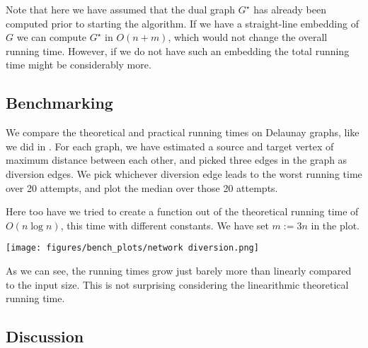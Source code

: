 Note that here we have assumed that the dual graph $G^\star$ has already been computed prior to starting the algorithm. If we have a straight-line embedding of $G$ we can compute $G^\star$ in $O(n+m)$, which would not change the overall running time. However, if we do not have such an embedding the total running time might be considerably more.

\subsection{Benchmarking}
We compare the theoretical and practical running times on Delaunay graphs, like we did in . For each graph, we have estimated a source and target vertex of maximum distance between each other, and picked three edges in the graph as diversion edges. We pick whichever diversion edge leads to the worst running time over 20 attempts, and plot the median over those 20 attempts.

Here too have we tried to create a function out of the theoretical running time of $O(n \log n)$, this time with different constants. We have set $m := 3n$ in the plot.

\texttt{[image: figures/bench\_plots/network diversion.png]}

As we can see, the running times grow just barely more than linearly compared to the input size. This is not surprising considering the linearithmic theoretical running time.



\subsection{Discussion}
